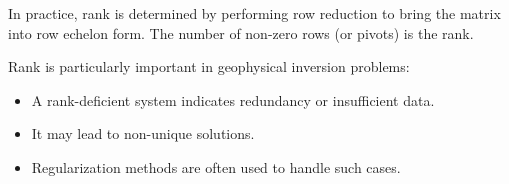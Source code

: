 In practice, rank is determined by performing row reduction to bring the matrix
into row echelon form. The number of non-zero rows (or pivots) is the rank.

Rank is particularly important in geophysical inversion problems:
\begin{itemize}
    \item A rank-deficient system indicates redundancy or insufficient data.
    \item It may lead to non-unique solutions.
    \item Regularization methods are often used to handle such cases.
\end{itemize}